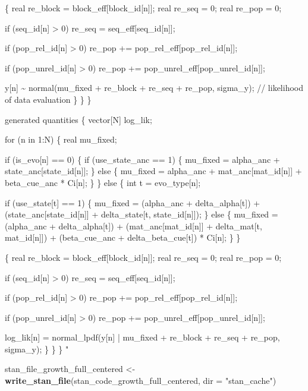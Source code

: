 \documentclass[
]{article}
\newenvironment{Shaded}{\begin{snugshade}}{\end{snugshade}}
\newcommand{\AttributeTok}[1]{\textcolor[rgb]{0.13,0.29,0.53}{#1}}
\newcommand{\FunctionTok}[1]{\textcolor[rgb]{0.13,0.29,0.53}{\textbf{#1}}}
\newcommand{\NormalTok}[1]{#1}
\newcommand{\OtherTok}[1]{\textcolor[rgb]{0.56,0.35,0.01}{#1}}
\newcommand{\StringTok}[1]{\textcolor[rgb]{0.31,0.60,0.02}{#1}}
\begin{document}
\begin{Shaded}
\begin{Highlighting}[]
\StringTok{    \{}
\StringTok{      real re\_block = block\_eff[block\_id[n]];}
\StringTok{      real re\_seq = 0;}
\StringTok{      real re\_pop = 0;}

\StringTok{      if (seq\_id[n] \textgreater{} 0)}
\StringTok{        re\_seq = seq\_eff[seq\_id[n]];}

\StringTok{      if (pop\_rel\_id[n] \textgreater{} 0)}
\StringTok{        re\_pop += pop\_rel\_eff[pop\_rel\_id[n]];}

\StringTok{      if (pop\_unrel\_id[n] \textgreater{} 0)}
\StringTok{        re\_pop += pop\_unrel\_eff[pop\_unrel\_id[n]]; }

\StringTok{      y[n] \textasciitilde{} normal(mu\_fixed + re\_block + re\_seq + re\_pop, sigma\_y); // likelihood of data evaluation}
\StringTok{    \}}
\StringTok{  \}}
\StringTok{\}}

\StringTok{generated quantities \{}
\StringTok{  vector[N] log\_lik;}

\StringTok{  for (n in 1:N) \{}
\StringTok{    real mu\_fixed;}

\StringTok{    if (is\_evo[n] == 0) \{}
\StringTok{      if (use\_state\_anc == 1) \{}
\StringTok{        mu\_fixed = alpha\_anc + state\_anc[state\_id[n]];}
\StringTok{      \} else \{}
\StringTok{        mu\_fixed = alpha\_anc}
\StringTok{                 + mat\_anc[mat\_id[n]]}
\StringTok{                 + beta\_cue\_anc * Ci[n];}
\StringTok{      \}}
\StringTok{    \} else \{}
\StringTok{      int t = evo\_type[n];}

\StringTok{      if (use\_state[t] == 1) \{}
\StringTok{        mu\_fixed = (alpha\_anc + delta\_alpha[t])}
\StringTok{                 + (state\_anc[state\_id[n]] + delta\_state[t, state\_id[n]]);}
\StringTok{      \} else \{}
\StringTok{        mu\_fixed = (alpha\_anc + delta\_alpha[t])}
\StringTok{                 + (mat\_anc[mat\_id[n]] + delta\_mat[t, mat\_id[n]])}
\StringTok{                 + (beta\_cue\_anc + delta\_beta\_cue[t]) * Ci[n];}
\StringTok{      \}}
\StringTok{    \}}

\StringTok{    \{}
\StringTok{      real re\_block = block\_eff[block\_id[n]];}
\StringTok{      real re\_seq = 0;}
\StringTok{      real re\_pop = 0;}

\StringTok{      if (seq\_id[n] \textgreater{} 0)}
\StringTok{        re\_seq = seq\_eff[seq\_id[n]];}

\StringTok{      if (pop\_rel\_id[n] \textgreater{} 0)}
\StringTok{        re\_pop += pop\_rel\_eff[pop\_rel\_id[n]];}

\StringTok{      if (pop\_unrel\_id[n] \textgreater{} 0)}
\StringTok{        re\_pop += pop\_unrel\_eff[pop\_unrel\_id[n]];}

\StringTok{      log\_lik[n] = normal\_lpdf(y[n] | mu\_fixed + re\_block + re\_seq + re\_pop, sigma\_y);}
\StringTok{    \}}
\StringTok{  \}}
\StringTok{\}}
\StringTok{"}

\NormalTok{stan\_file\_growth\_full\_centered }\OtherTok{\textless{}{-}} \FunctionTok{write\_stan\_file}\NormalTok{(stan\_code\_growth\_full\_centered, }\AttributeTok{dir =} \StringTok{"stan\_cache"}\NormalTok{)}
\end{Highlighting}
\end{Shaded}
\end{document}
